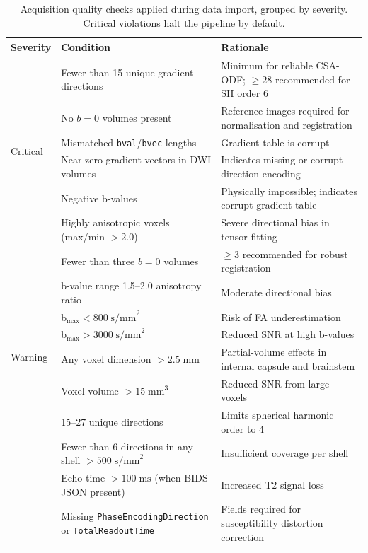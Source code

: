 \begin{table}[htbp]
\centering
\caption{Acquisition quality checks applied during data import, grouped by severity. Critical violations halt the pipeline by default.}
\label{tab:qa_checks}
\small
\begin{tabular}{p{1.8cm} p{5.5cm} p{5.5cm}}
\toprule
\textbf{Severity} & \textbf{Condition} & \textbf{Rationale} \\
\midrule
\multirow{6}{*}{Critical}
  & Fewer than 15 unique gradient directions & Minimum for reliable CSA-ODF; $\geq 28$ recommended for SH order 6 \\
  & No $b = 0$ volumes present & Reference images required for normalisation and registration \\
  & Mismatched \texttt{bval}/\texttt{bvec} lengths & Gradient table is corrupt \\
  & Near-zero gradient vectors in DWI volumes & Indicates missing or corrupt direction encoding \\
  & Negative b-values & Physically impossible; indicates corrupt gradient table \\
  & Highly anisotropic voxels (max/min $> 2.0$) & Severe directional bias in tensor fitting \\
\midrule
\multirow{8}{*}{Warning}
  & Fewer than three $b = 0$ volumes & $\geq 3$ recommended for robust registration \\
  & b-value range 1.5--2.0 anisotropy ratio & Moderate directional bias \\
  & b$_\text{max} < 800\;\text{s/mm}^2$ & Risk of FA underestimation \\
  & b$_\text{max} > 3000\;\text{s/mm}^2$ & Reduced SNR at high b-values \\
  & Any voxel dimension $> 2.5\;\text{mm}$ & Partial-volume effects in internal capsule and brainstem \\
  & Voxel volume $> 15\;\text{mm}^3$ & Reduced SNR from large voxels \\
  & 15--27 unique directions & Limits spherical harmonic order to 4 \\
  & Fewer than 6 directions in any shell $> 500\;\text{s/mm}^2$ & Insufficient coverage per shell \\
  & Echo time $> 100\;\text{ms}$ (when BIDS JSON present) & Increased T2 signal loss \\
  & Missing \texttt{PhaseEncodingDirection} or \texttt{TotalReadoutTime} & Fields required for susceptibility distortion correction \\
\midrule

\end{tabular}
\end{table}
